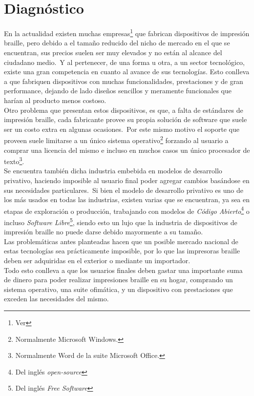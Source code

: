 \chapter{Diagn\'ostico}

En la actualidad existen muchas empresas\footnote{Ver } que
fabrican dispositivos de
impresi\'on braille, pero debido a el tama\~no reducido del nicho de mercado
en el que se encuentran, sus precios suelen ser muy elevados y no est\'an al
alcance del ciudadano medio.\ Y al pertenecer, de una forma u otra, a un sector
tecnol\'ogico, existe una gran competencia en cuanto al avance de sus
tecnolog\'ias. Esto conlleva a que fabriquen dispositivos con muchas
funcionalidades, prestaciones y de gran performance, dejando de lado dise\~nos
sencillos y meramente funcionales que har\'ian al producto menos costoso.\\

Otro problema que presentan estos dispositivos, es que, a falta de est\'andares
de impresi\'on braille, cada fabricante provee su propia soluci\'on de
software que suele ser un costo extra en algunas ocasiones.\ 
Por este mismo motivo el soporte que proveen suele limitarse a un \'unico
sistema operativo\footnote{Normalmente Microsoft Windows.} forzando al usuario
a comprar una licencia del mismo e incluso en muchos casos un \'unico
procesador de texto\footnote{Normalmente Word de la suite Microsoft Office.}.\\

Se encuentra tambi\'en dicha industria embebida en modelos de desarrollo
privativo, haciendo imposible al usuario final poder agregar cambios
bas\'andose en sus necesidades particulares.\ Si bien el modelo de desarrollo
privativo es uno de los m\'as usados en todas las industrias, existen varias
que
se encuentran, ya sea en etapas de exploraci\'on o producci\'on, trabajando con
modelos de \emph{C\'odigo Abierto}\footnote{Del ingl\'es \emph{open-source}} o
incluso \emph{Software Libre}\footnote{Del ingl\'es \emph{ Free Software}},
siendo esto un lujo que la industria de dispositivos de impresi\'on braille no
puede darse debido mayormente a su tama\~no.\\

Las problem\'aticas antes planteadas hacen que un posible mercado nacional de
estas tecnolog\'ias sea pr\'acticamente imposible, por lo que las impresoras
braille deben ser adquiridas en el exterior o mediante un importador.\\

Todo esto conlleva a que los usuarios finales deben gastar una importante suma
de dinero para poder realizar impresiones braille en su hogar, comprando un
sistema operativo, una suite ofim\'atica, y un dispositivo con prestaciones
que exceden las necesidades del mismo.
